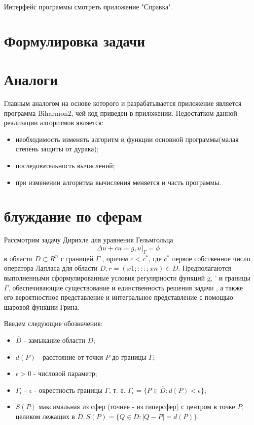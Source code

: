 Интерфейс программы смотреть приложение "Справка".

\section{Формулировка задачи}

\section{Аналоги}
Главным аналогом на основе которого и разрабатывается приложение является программа Biharmon2, чей код приведен в приложении. Недостатком данной реализации алгоритмов является:
\begin{itemize}
	\item необходимость изменять алгоритм и функции основной программы(малая степень защиты от дурака);
	\item последовательность вычислений;
	\item при изменении алгоритма вычисления меняется и часть программы.
\end{itemize}
\section{блуждание по сферам}
Рассмотрим задачу Дирихле для уравнения Гельмгольца
\[ \Delta u + cu = g,	 u|_{\Gamma} = \phi \]
в области $D \subset R^{n}$ с границей $\Gamma$ , причем $c < c^{*}$, где $c^{*}$ первое собственное число оператора Лапласа для области $D, r = (x1; : : : ; xn) \in D$. Предполагаются выполненными сформулированные условия регулярности функций g, ' и границы $\Gamma$, обеспечивающие существование и единственность решения задачи , а также его вероятностное представление и интегральное представление с помощью шаровой функции Грина.

Введем следующие обозначения:
\begin{itemize}
	\item $\bar{D}$  - замыкание области $D$;
	\item $d(P)$ - расстояние от точки $P$ до границы $\Gamma$;
	\item $\epsilon > 0 $ - числовой параметр;
	\item $\Gamma_{\epsilon }$ - $\epsilon$ - окрестность границы $\Gamma$, т. е. $ \Gamma_{\epsilon }=\{ P \in \bar{D}:d(P) < \epsilon \} $;
	\item $S(P)$  максимальная из сфер (точнее - из гиперсфер) с центром в точке $P$, целиком лежащих в $\bar{D}, S(P) = \{Q \in \bar{D}: |Q - P| = d(P)\}$.
\end{itemize}

